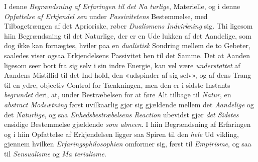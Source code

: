 I denne \emph{Begrændsning af Erfaringen til det Na\-%
turlige}, Materielle, og i denne \emph{Opfattelse af Erkjendel\-%
sen} under \emph{Passivitetens} Bestemmelse, med Tilbagetrængen
af det Aprioriske, røber \emph{Dualismens Indvirkning} sig. Thi
ligesom hiin Begrændsning til det Naturlige, der er en Ude\-%
lukken af det Aandelige, som dog ikke kan fornægtes, hviler
paa en \emph{dualistisk} Sondring mellem de to Gebeter, saaledes
viser ogsaa Erkjendelsens Passivitet hen til det Samme. Det
at Aanden ligesom seer bort fra sig selv i sin indre Energie,
kan vel være \emph{understøttet} af Aandens Mistillid til det Ind\-%
hold, den «udspinder af sig selv», og af dens Trang til en
ydre, objectiv Control for Tænkningen, men den er i sidste
Instants \emph{begrundet} deri, at, under Bestræbelsen for at føre
Alt tilbage til \emph{Natur}, en \emph{abstract Modsætning} først
uvilkaarlig gjør sig gjældende mellem det \emph{Aandelige} og det
\emph{Naturlige}, og saa \emph{Enhedsbestræbelsens Reaction}
ubevidst gjør \emph{det Sidstes} ensidige Bestemmelse gjældende
\emph{som almeen}. I hiin Begrændsning af Erfaringen og i hiin
Opfattelse af Erkjendelsen ligger saa Spiren til den \emph{hele} Ud\-%
vikling, gjennem hvilken \emph{Erfaringsphilosophien} omformer
sig, først til \emph{Empirisme}, og saa til \emph{Sensualisme} og \emph{Ma\-%
terialisme}.

